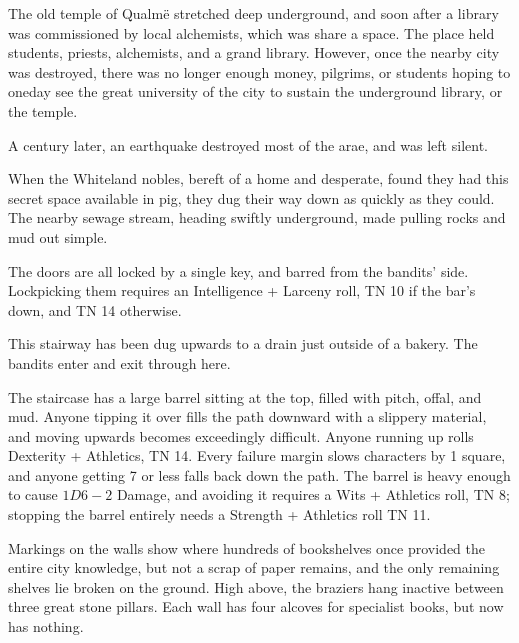 \vspace{-1.2cm}

\label{sewer_map}

The old temple of Qualm\"{e} stretched deep underground, and soon after a library was commissioned by local alchemists, which was share a space.  The place held students, priests, alchemists, and a grand library.  However, once the nearby city was destroyed, there was no longer enough money, pilgrims, or students hoping to oneday see the great university of the city to sustain the underground library, or the temple.

A century later, an earthquake destroyed most of the arae, and was left silent.

When the Whiteland nobles, bereft of a home and desperate, found they had this secret space available in \gls{pig}, they dug their way down as quickly as they could.  The nearby sewage stream, heading swiftly underground, made pulling rocks and mud out simple.

The doors are all locked by a single key, and barred from the bandits' side.  Lockpicking them requires an Intelligence + Larceny roll, TN 10 if the bar's down, and TN 14 otherwise.


This stairway has been dug upwards to a drain just outside of a bakery.  The bandits enter and exit through here.

The staircase has a large barrel sitting at the top, filled with pitch, offal, and mud.  Anyone tipping it over fills the path downward with a slippery material, and moving upwards becomes exceedingly difficult.  Anyone running up rolls Dexterity + Athletics, TN 14.  Every failure margin slows characters by 1 square, and anyone getting 7 or less falls back down the path.  The barrel is heavy enough to cause $1D6-2$ Damage, and avoiding it requires a Wits + Athletics roll, TN 8; stopping the barrel entirely needs a Strength + Athletics roll TN 11.


\label{oldlibrary}

\begin{boxtext}

	Markings on the walls show where hundreds of bookshelves once provided the entire city knowledge, but not a scrap of paper remains, and the only remaining shelves lie broken on the ground.  High above, the braziers hang inactive between three great stone pillars.  Each wall has four alcoves for specialist books, but now has nothing.

\end{boxtext}

